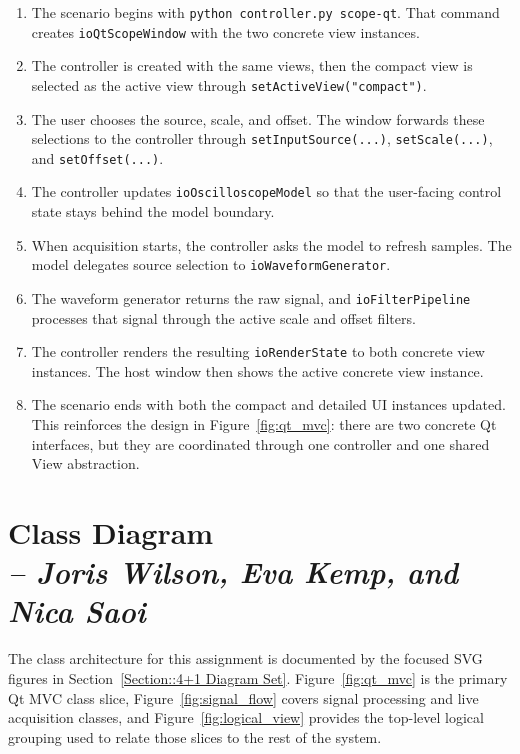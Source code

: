 \begin{enumerate}
    \item The scenario begins with \texttt{python controller.py scope-qt}. That command creates \texttt{ioQtScopeWindow} with the two concrete view instances.
    \item The controller is created with the same views, then the compact view is selected as the active view through \texttt{setActiveView("compact")}.
    \item The user chooses the source, scale, and offset. The window forwards these selections to the controller through \texttt{setInputSource(...)}, \texttt{setScale(...)}, and \texttt{setOffset(...)}.
    \item The controller updates \texttt{ioOscilloscopeModel} so that the user-facing control state stays behind the model boundary.
    \item When acquisition starts, the controller asks the model to refresh samples. The model delegates source selection to \texttt{ioWaveformGenerator}.
    \item The waveform generator returns the raw signal, and \texttt{ioFilterPipeline} processes that signal through the active scale and offset filters.
    \item The controller renders the resulting \texttt{ioRenderState} to both concrete view instances. The host window then shows the active concrete view instance.
    \item The scenario ends with both the compact and detailed UI instances updated. This reinforces the design in Figure~\ref{fig:qt_mvc}: there are two concrete Qt interfaces, but they are coordinated through one controller and one shared View abstraction.
\end{enumerate}

\section{Class Diagram \\
\small{\textit{-- Joris Wilson, Eva Kemp, and Nica Saoi}}}
\label{Section::Class Diagram}

The class architecture for this assignment is documented by the focused SVG figures in Section~\ref{Section::4+1 Diagram Set}. Figure~\ref{fig:qt_mvc} is the primary Qt MVC class slice, Figure~\ref{fig:signal_flow} covers signal processing and live acquisition classes, and Figure~\ref{fig:logical_view} provides the top-level logical grouping used to relate those slices to the rest of the system.

